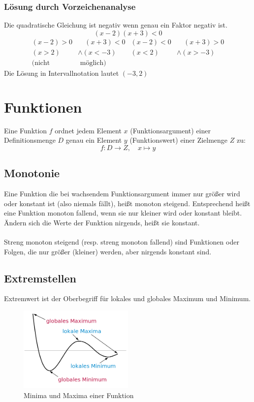 \documentclass[a4paper]{article}
\begin{document}
\subsubsection{Lösung durch Vorzeichenanalyse}
Die quadratische Gleichung ist negativ wenn genau ein Faktor negativ ist.
\[(x-2)(x+3)<0\]
\begin{align*}
(x-2)>0 &\quad (x+3)<0 & (x-2)<0 &\quad(x+3)>0 \\
{(x>2)} &\wedge {(x<-3)} & {(x<2)} &\wedge {(x>-3)} \\
\text{(nicht}&\text{ möglich)}
\end{align*}
Die Lösung in Intervallnotation lautet $(-3,2)$

\section{Funktionen}
Eine Funktion $f$ ordnet jedem Element $x$ (Funktionsargument) einer Definitionsmenge $D$ genau ein Element $y$ (Funktionswert) einer Zielmenge $Z$ zu:
\[
f: D \rightarrow Z, \quad x \mapsto y
\]
\subsection{Monotonie}
Eine Funktion die bei wachsendem Funktionsargument immer nur größer wird oder konstant ist (also niemals fällt), heißt monoton steigend. Entsprechend heißt eine Funktion monoton fallend, wenn sie nur kleiner wird oder konstant bleibt. Ändern sich die Werte der Funktion nirgends, heißt sie konstant. \\\\
Streng monoton steigend (resp. streng monoton fallend) sind Funktionen oder Folgen, die nur größer (kleiner) werden, aber nirgends konstant sind.
\subsection{Extremstellen}
Extremwert ist der Oberbegriff für lokales und globales Maximum und Minimum.
\begin{figure}[h]
\centering
\includegraphics[width=0.5\textwidth]{images/extremstellen.png}\caption{\label{fig:extremstellen}{Minima und Maxima einer Funktion}}
\end{figure}
\end{document}
